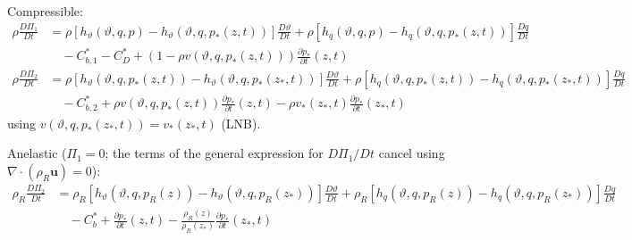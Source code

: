 \documentclass{article}
\begin{document}
Compressible:
\begin{align}
    \rho \frac{D \Pi_1}{D t}
    & =
    \rho \left[
        h_\vartheta(\vartheta, q, p)
        - h_\vartheta(\vartheta, q, p_*(z, t))
    \right]
    \frac{D \vartheta}{D t}
    + \rho \left[
        h_q(\vartheta, q, p)
        - h_q(\vartheta, q, p_*(z, t))
    \right]
    \frac{D q}{D t}
    \nonumber
    \\
    & \quad
    - C_{b,1}^*
    - C_D^*
    + \left( 1 - \rho v(\vartheta, q, p_*(z, t)) \right) \frac{\partial p_*}{\partial t}(z, t)
    \\
    \rho \frac{D \Pi_2}{D t}
    & =
    \rho \left[
        h_\vartheta(\vartheta, q, p_*(z, t))
        - h_\vartheta(\vartheta, q, p_*(z_*, t))
    \right]
    \frac{D \vartheta}{D t}
    + \rho \left[
        h_q(\vartheta, q, p_*(z, t))
        - h_q(\vartheta, q, p_*(z_*, t))
    \right]
    \frac{D q}{D t}
    \nonumber
    \\
    & \quad
    - C_{b,2}^*
    + \rho v(\vartheta, q, p_*(z, t)) \frac{\partial p_*}{\partial t}(z, t)
    - \rho v_*(z_*, t) \frac{\partial p_*}{\partial t}(z_*, t)
\end{align}
using \(v(\vartheta, q, p_*(z_*, t)) = v_*(z_*, t)\) (LNB).

Anelastic (\(\Pi_1 = 0\); the terms of the general expression for \(D \Pi_1 / D t\) cancel using \(\nabla \cdot (\rho_R \mathbf{u}) = 0\)):
\begin{align}
    \rho_R \frac{D \Pi_2}{D t}
    & =
    \rho_R \left[
        h_\vartheta(\vartheta, q, p_R(z))
        - h_\vartheta(\vartheta, q, p_R(z_*))
    \right]
    \frac{D \vartheta}{D t}
    + \rho_R \left[
        h_q(\vartheta, q, p_R(z))
        - h_q(\vartheta, q, p_R(z_*))
    \right]
    \frac{D q}{D t}
    \nonumber
    \\
    & \quad
    - C_b^*
    + \frac{\partial p_*}{\partial t}(z, t)
    - \frac{\rho_R(z)}{\rho_R(z_*)} \frac{\partial p_*}{\partial t}(z_*, t)
\end{align}
\end{document}
